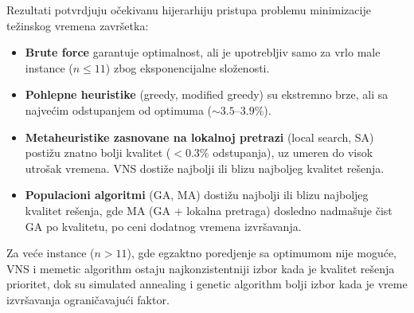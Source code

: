 \documentclass{article}
\begin{document}
Rezultati potvrdjuju očekivanu hijerarhiju pristupa problemu minimizacije
težinskog vremena završetka:
\begin{itemize}
    \item \textbf{Brute force} garantuje optimalnost, ali je upotrebljiv
        samo za vrlo male instance ($n \leq 11$) zbog eksponencijalne
        složenosti.
    \item \textbf{Pohlepne heuristike} (greedy, modified greedy) su
        ekstremno brze, ali sa najvećim odstupanjem od optimuma
        ($\sim 3.5$--$3.9\%$).
    \item \textbf{Metaheuristike zasnovane na lokalnoj pretrazi} (local
        search, SA) postižu znatno bolji kvalitet
        ($< 0.3\%$ odstupanja), uz umeren do visok utrošak vremena. 
        VNS dostiže najbolji ili blizu najboljeg kvalitet rešenja.
    \item \textbf{Populacioni algoritmi} (GA, MA) dostižu najbolji ili
        blizu najboljeg kvalitet rešenja, gde MA (GA + lokalna pretraga)
        dosledno nadmašuje čist GA po kvalitetu, po ceni dodatnog vremena
        izvršavanja.
\end{itemize}

Za veće instance ($n > 11$), gde egzaktno poredjenje sa optimumom nije
moguće, VNS i memetic algorithm ostaju najkonzistentniji izbor kada je
kvalitet rešenja prioritet, dok su simulated annealing i genetic
algorithm bolji izbor kada je vreme izvršavanja ograničavajući faktor.
\end{document}
